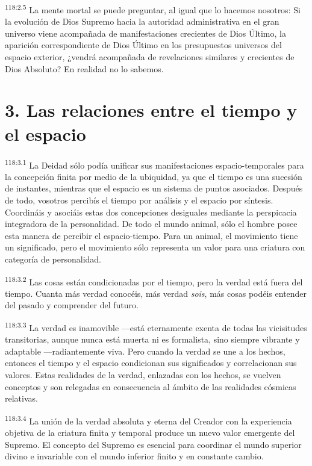 \par
\textsuperscript{118:2.5} La mente mortal se puede preguntar, al igual que lo hacemos nosotros: Si la evolución de Dios Supremo hacia la autoridad administrativa en el gran universo viene acompañada de manifestaciones crecientes de Dios Último, la aparición correspondiente de Dios Último en los presupuestos universos del espacio exterior, ¿vendrá acompañada de revelaciones similares y crecientes de Dios Absoluto? En realidad no lo sabemos.

\section*{3. Las relaciones entre el tiempo y el espacio}
\par
\textsuperscript{118:3.1} La Deidad sólo podía unificar sus manifestaciones espacio-temporales para la concepción finita por medio de la ubiquidad, ya que el tiempo es una sucesión de instantes, mientras que el espacio es un sistema de puntos asociados. Después de todo, vosotros percibís el tiempo por análisis y el espacio por síntesis. Coordináis y asociáis estas dos concepciones desiguales mediante la perspicacia integradora de la personalidad. De todo el mundo animal, sólo el hombre posee esta manera de percibir el espacio-tiempo. Para un animal, el movimiento tiene un significado, pero el movimiento sólo representa un valor para una criatura con categoría de personalidad.

\par
\textsuperscript{118:3.2} Las cosas están condicionadas por el tiempo, pero la verdad está fuera del tiempo. Cuanta más verdad conocéis, más verdad \textit{sois}, más cosas podéis entender del pasado y comprender del futuro.

\par
\textsuperscript{118:3.3} La verdad es inamovible ---está eternamente exenta de todas las vicisitudes transitorias, aunque nunca está muerta ni es formalista, sino siempre vibrante y adaptable ---radiantemente viva. Pero cuando la verdad se une a los hechos, entonces el tiempo y el espacio condicionan sus significados y correlacionan sus valores. Estas realidades de la verdad, enlazadas con los hechos, se vuelven conceptos y son relegadas en consecuencia al ámbito de las realidades cósmicas relativas.

\par
\textsuperscript{118:3.4} La unión de la verdad absoluta y eterna del Creador con la experiencia objetiva de la criatura finita y temporal produce un nuevo valor emergente del Supremo. El concepto del Supremo es esencial para coordinar el mundo superior divino e invariable con el mundo inferior finito y en constante cambio.

